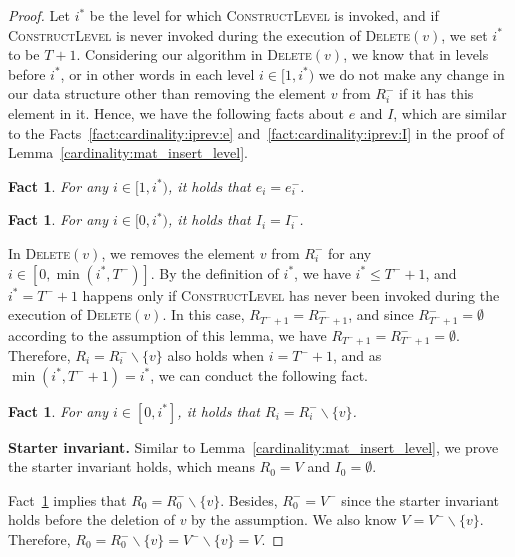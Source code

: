 \documentclass[11pt]{article}
\newtheorem{fact}[theorem]{Fact}
\newcommand{\constLevel}{\textsc{ConstructLevel}}
\newcommand{\deletev}{{\textsc{Delete}}}
\begin{document}
\begin{proof}

Let $i^*$ be the level for which \constLevel{} is invoked, and if \constLevel{} is never invoked during the execution of \deletev$(v)$, we set $i^*$ to be $T + 1$.
Considering our algorithm in \deletev$(v)$, we know that in levels before $i^*$, or in other words in each level $i \in [1, i^*)$ we do not make any change in our data structure other than removing the element $v$ from $R_{i}^-$ if it has this element in it. 
Hence, we have the following facts about $e$ and $I$, which are similar to the Facts~\ref{fact:cardinality:iprev:e} and~\ref{fact:cardinality:iprev:I} in the proof of Lemma~\ref{cardinality:mat_insert_level}.

\begin{fact}
\label{fact:cardinality:prev:e}
For any $i \in [1, i^*)$, it holds that $e_i = e_i^-$. 
\end{fact}

\begin{fact}
\label{fact:cardinality:prev:I}
For any $i \in [0, i^*)$, it holds that $I_i = I_i^-$.
\end{fact}

In \deletev$(v)$, we removes the element $v$ from $R_{i}^-$ for any $i\in[0,\min(i^*,T^-)]$.
By the definition of $i^*$, we have $i^*\leq T^-+1$, and $i^*=T^-+1$ happens only if \constLevel{} has never been invoked during the execution of \deletev$(v)$. In this case, 
$R_{T^-+1} = R_{T^-+1}^-$, and since $R_{T^-+1}^- = \emptyset$ according to the assumption of this lemma, we have $R_{T^-+1} = R_{T^-+1}^-=\emptyset$.
Therefore, $R_i = R_i^- \backslash \{v\}$ also holds when $i=T^-+1$, and as $\min(i^*,T^-+1)=i^*$, we can conduct the following fact.

\begin{fact}
\label{fact:cardinality:prev:R}
For any $i \in [0, i^*]$, it holds that $R_i = R_i^- \backslash \{v\}$.
\end{fact}


\textbf{Starter invariant. }
Similar to Lemma~\ref{cardinality:mat_insert_level}, we prove the starter invariant holds, which means $R_0=V$ and $I_0=\emptyset$.

Fact~\ref{fact:cardinality:prev:R} implies that $R_0 = R_0^- \backslash \{v\}$.
Besides, $ R_0^- = V^-$ since the starter invariant holds before the deletion of $v$ by the assumption.
We also know $V=V^- \backslash \{v\}$. Therefore, 
$R_0 = R_0^- \backslash \{v\}=V^- \backslash \{v\}= V$.


\end{proof}
\end{document}
